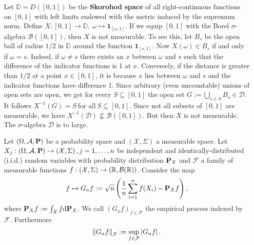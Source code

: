 \begin{example}
  \emph{\cite[Problem~1.7.3]{vaart2013}}
  Let $\mathbb{D}=D([0,1])$ be the \textbf{Skorohod space} of all right-continuous functions on $[0,1]$
  with left limits endowed with the metric induced by the supremum norm.
  Define 
  $
    X:
    [0,1]
    \to
    \mathbb{D}
    ,\ 
    \omega
    \mapsto
    \mathbf{1}_{[\omega,1]}
    .
  $
  If we equip $[0,1]$ with the Borel $\sigma$-algebra 
  $\mathcal{B}([0,1])$, then 
  $X$ is not measurable. To see this, let $B_s$ be the open ball of radius $1/2$ in $\mathbb{D}$ around the function $\mathbf{1}_{[s,1]}.$
  Now $X(\omega)\in B_s$
  if and only if $\omega=s.$ Indeed, if $\omega\neq s$ there exists an $x$ between $\omega$ and $s$ such that the difference of the indicator functions is 1 at $x$. Conversely, if the distance is greater than
  $1/2$ at a point $x\in [0,1]$, it is because $x$ lies between $\omega$ and $s$ and the indicator functions have difference 1.
  Since arbitrary (even uncountable) unions of open sets are open,
  we get for every $S\subseteq [0,1]$ the open set 
  $
  G
  :=
  \bigcup_{s\in S}
    B_s
    \in \mathcal{D}
    .
  $
  It follows
  $
  X^{-1}(G)=S 
  \ 
  \text{for all}
  \ 
  S \subseteq [0,1]
  .
  $
  Since not all subsets of $[0,1]$ are measurable, we have
  $
  X^{-1}(\mathcal{D})\nsubseteq \mathcal{B}([0,1])
.
$
But then $X$ is not measurable. The $\sigma$-algebra $\mathcal{D}$ is to large.
\end{example}



Let 
$
  \left( 
    \Omega,
    \mathcal{A},
    \P
  \right)
$
be a probability space
and
$
  \left( 
    \mathcal{X},
    \Sigma
  \right)
$
a measurable space.
Let 
$
  X_j
  :
  \left( 
    \Omega,
    \mathcal{A},
    \P
  \right)
  \to
  \left( 
    \mathcal{X},
    \Sigma
  \right)
  ,
  j=1,\ldots, n
$ be independent and identically-distributed (i.i.d.)
random variables
with probability distribution $\P_X$ 
and
$\mathcal{F}$ a family of measurable functions
$
  f:
  \left( 
    \mathcal{X},
    \Sigma
  \right)
    \to
  \left( 
    \R,
    \mathcal{B}(\R)
  \right)
$.
Consider the map
\begin{gather}
  f
  \mapsto
  G_n f
  :=
  \sqrt{n}
  \left( 
    \frac{1}{n}
    \sum_{i = 1}^{n}
      f(X_i)
    -
    \P_X f
  \right),
\end{gather}
where
$
  \P_X f 
  :=
  \int_\mathcal{X} f \text{d}\P_X.
$
We call 
$
  \left( 
    G_n f
  \right)_{f \in \mathcal{F}}
$
the empirical process indexed by $\mathcal{F}$.
Furthermore
\begin{gather}
  \norm{G_n f}_\mathcal{F}
  :=
  \sup_
        { f \in \mathcal{F}}
        \left|
          G_n f
        \right|
        .
\end{gather}


